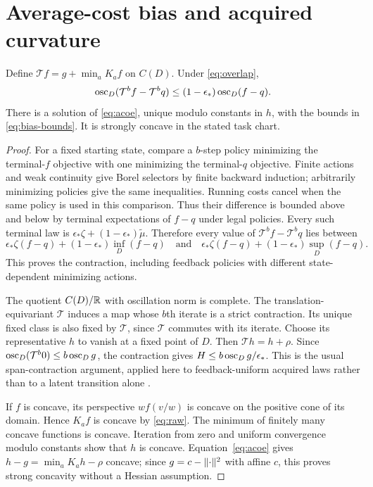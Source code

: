 \section{Average-cost bias and acquired curvature}\label{sec:bellman}
\begin{lemma}\label{lem:span}
Define $\mathcal T f=g+\min_aK_af$ on $C(D)$. Under \eqref{eq:overlap},
\[
 \operatorname{osc}_D(\mathcal T^bf-\mathcal T^bq)
 \le(1-\epsilon_*)\operatorname{osc}_D(f-q).
\]
There is a solution of \eqref{eq:acoe}, unique modulo constants in $h$, with the bounds in \eqref{eq:bias-bounds}. It is strongly concave in the stated task chart.
\end{lemma}
\begin{proof}
For a fixed starting state, compare a $b$-step policy minimizing the terminal-$f$ objective with one minimizing the terminal-$q$ objective. Finite actions and weak continuity give Borel selectors by finite backward induction; arbitrarily minimizing policies give the same inequalities. Running costs cancel when the same policy is used in this comparison. Thus their difference is bounded above and below by terminal expectations of $f-q$ under legal policies. Every such terminal law is
$\epsilon_*\zeta+(1-\epsilon_*)\widetilde\mu$. Therefore every value of $\mathcal T^bf-\mathcal T^bq$ lies between
\[
 \epsilon_*\zeta(f-q)+(1-\epsilon_*)\inf_D(f-q)
 \quad\text{and}\quad
 \epsilon_*\zeta(f-q)+(1-\epsilon_*)\sup_D(f-q).
\]
This proves the contraction, including feedback policies with different state-dependent minimizing actions.

The quotient $C(D)/\mathbb R$ with oscillation norm is complete. The translation-equivariant $\mathcal T$ induces a map whose $b$th iterate is a strict contraction. Its unique fixed class is also fixed by $\mathcal T$, since $\mathcal T$ commutes with its iterate. Choose its representative $h$ to vanish at a fixed point of $D$. Then $\mathcal T h=h+\rho$. Since $\operatorname{osc}_D(\mathcal T^b0)\le b\operatorname{osc}_Dg$, the contraction gives $H\le b\operatorname{osc}_Dg/\epsilon_*$. This is the usual span-contraction argument, applied here to feedback-uniform acquired laws rather than to a latent transition alone \cite{Dobrushin1956,Kurano1986}.

If $f$ is concave, its perspective $w f(v/w)$ is concave on the positive cone of its domain. Hence $K_af$ is concave by \eqref{eq:raw}. The minimum of finitely many concave functions is concave. Iteration from zero and uniform convergence modulo constants show that $h$ is concave. Equation~\eqref{eq:acoe} gives
$h-g=\min_aK_ah-\rho$ concave; since $g=c-\lVert\cdot\rVert^2$ with affine $c$, this proves strong concavity without a Hessian assumption.


\end{proof}
